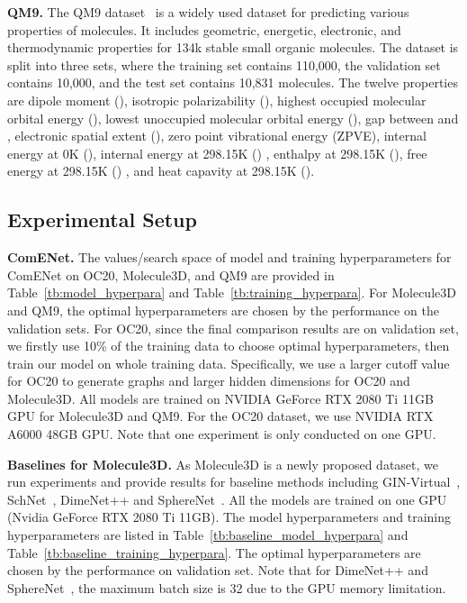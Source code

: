 \documentclass{article}
\begin{document}
\textcolor{COLOR}{\textbf{QM9.} The QM9 dataset~\citep{ramakrishnan2014quantum} is a widely used dataset for predicting various properties of molecules. It includes geometric, energetic, electronic, and thermodynamic properties for 134k stable small organic molecules. The dataset is split into three sets, where the training set contains 110,000, the validation set contains 10,000, and the test set contains 10,831 molecules. The twelve properties are dipole moment (), isotropic polarizability (), highest occupied molecular orbital energy (), lowest unoccupied molecular orbital energy (), gap between  and , electronic spatial extent (), zero point vibrational energy (ZPVE), internal energy at 0K (), internal energy at 298.15K () , enthalpy at 298.15K (), free energy at 298.15K () , and heat capavity at 298.15K (). }

\subsection{Experimental Setup}   \label{sec:setup}
\textbf{ComENet.} The values/search space of model and training hyperparameters for ComENet on OC20, Molecule3D, and QM9 are provided in Table~\ref{tb:model_hyperpara} and Table~\ref{tb:training_hyperpara}. For Molecule3D and QM9, the optimal hyperparameters are chosen by the performance on the validation sets. For OC20, since the final comparison results are on validation set, we firstly use 10\% of the training data to choose optimal hyperparameters, then train our model on whole training data.
Specifically, we use a larger cutoff value for OC20 to generate graphs and larger hidden dimensions for OC20 and Molecule3D.
All models are trained on NVIDIA GeForce RTX 2080 Ti 11GB GPU for Molecule3D and QM9. 
For the OC20 dataset, we use NVIDIA RTX A6000 48GB GPU. Note that one experiment is only conducted on one GPU.

\textbf{Baselines for Molecule3D.} As Molecule3D is a newly proposed dataset, we run experiments and provide results for baseline methods including GIN-Virtual~\cite{hu2021ogb}, SchNet~\cite{schutt2017schnet}, DimeNet++\cite{klicpera_dimenetpp_2020} and SphereNet~\cite{liu2022spherical}. 
All the models are trained on one GPU (Nvidia GeForce RTX 2080 Ti 11GB). The model hyperparameters and training hyperparameters are listed in Table~\ref{tb:baseline_model_hyperpara} and Table~\ref{tb:baseline_training_hyperpara}. The optimal hyperparameters are chosen by the performance on validation set. Note that for DimeNet++\cite{klicpera_dimenetpp_2020} and SphereNet~\cite{liu2022spherical}, the maximum batch size is 32 due to the GPU memory limitation.
\end{document}

